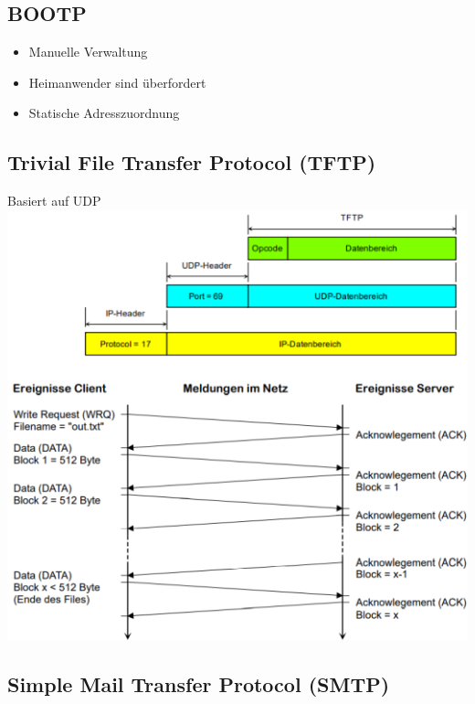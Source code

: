\subsection{BOOTP}{
    \begin{itemize}[noitemsep]
        \item Manuelle Verwaltung
        \item Heimanwender sind überfordert
        \item Statische Adresszuordnung
    \end{itemize}

}



\subsection{Trivial File Transfer Protocol (TFTP)}
{Basiert auf UDP}
\includegraphics[scale=.5]{img/tftp.png}

\subsection{Simple Mail Transfer Protocol (SMTP)}


